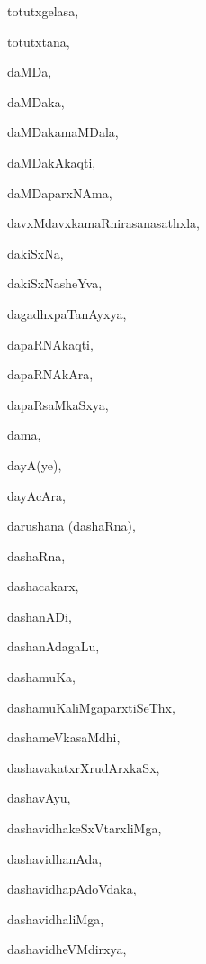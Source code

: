 \begin{multicols}{2}
{totutxgelasa}, \pageref{totutxgelasa}

{totutxtana}, \pageref{totutxtana}

{daMDa}, \pageref{daMDa}

{daMDaka}, \pageref{daMDaka}

{daMDakamaMDala}, \pageref{daMDakamaMDala}

{daMDakAkaqti}, \pageref{daMDakAkaqti}

{daMDaparxNAma}, \pageref{daMDaparxNAma}

{davxMdavxkamaRnirasanasathxla}, \pageref{davxMdavxkamaRnirasanasathxla}

{dakiSxNa}, \pageref{dakiSxNa}

{dakiSxNasheYva}, \pageref{dakiSxNasheYva}

{dagadhxpaTanAyxya}, \pageref{dagadhxpaTanAyxya}

{dapaRNAkaqti}, \pageref{dapaRNAkaqti}

{dapaRNAkAra}, \pageref{dapaRNAkAra}

{dapaRsaMkaSxya}, \pageref{dapaRsaMkaSxya}

{dama}, \pageref{dama}

{dayA(ye)}, \pageref{dayAye}

{dayAcAra}, \pageref{dayAcAra}

{darushana (dashaRna)}, \pageref{darushana dashaRna}

{dashaRna}, \pageref{dashaRna}

{dashacakarx}, \pageref{dashacakarx}

{dashanADi}, \pageref{dashanADi}

{dashanAda\-gaLu}, \pageref{dashanAdagaLu}

{dashamuKa}, \pageref{dashamuKa}

{dashamuKaliMgaparxtiSeThx}, \pageref{dashamuKaliMgaparxtiSeThx}

{dashameVkasaMdhi}, \pageref{dashameVkasaMdhi}

{dashavakatxrXrudArxkaSx}, \pageref{dashavakatxrXrudArxkaSx}

{dashavAyu}, \pageref{dashavAyu}

{dashavidhakeSxVtarxliMga}, \pageref{dashavidhakeSxVtarxliMga}

{dashavidhanAda}, \pageref{dashavidhanAda}

{dashavidhapAdoVdaka}, \pageref{dashavidhapAdoVdaka}

{dashavidhaliMga}, \pageref{dashavidhaliMga}

{dashavidheVMdirxya}, \pageref{dashavidheVMdirxya}


\end{multicols}
